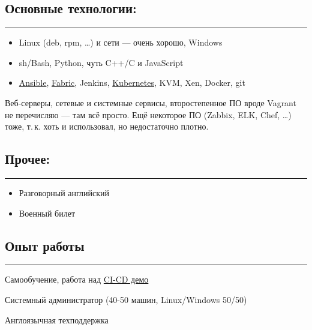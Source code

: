 \documentclass[10pt, a4paper]{article}
\newcommand{\Delimitline}{
  \vspace{-4ex}
  \textcolor[RGB]{120,120,120}{\rule{\linewidth}{1pt}}
  \vspace{-4ex}
}
\begin{document}
\subsection*{Основные технологии:}
\Delimitline
\begin{itemize}
  \item Linux (deb, rpm, \dots) и сети — очень хорошо, Windows
  \item sh/Bash, Python, чуть C++/C и JavaScript
  \item \href{https://github.com/bititanb/ansible-taskmngr}{Ansible}, \href{https://bitbucket.org/bititanb/ivd-fabric/src}{Fabric}, Jenkins, \href{https://github.com/bititanb/ansible-taskmngr/tree/master/roles/taskmngr-kubernetes/templates}{Kubernetes}, KVM, Xen, Docker, git\par
\end{itemize}

Веб-серверы, сетевые и системные сервисы, второстепенное ПО вроде Vagrant не перечисляю — там всё просто. Ещё некоторое ПО (Zabbix, ELK, Chef, \dots) тоже, т.\,к. хоть и использовал, но недостаточно плотно.

\subsection*{Прочее:}
\Delimitline
\begin{itemize}
  \item Разговорный английский
  \item Военный билет
\end{itemize}

\subsection*{Опыт работы}
\Delimitline
\begin{etaremune}
  \item Самообучение, работа над \href{https://github.com/bititanb/CI-CD-pipeline}{CI-CD демо}
  \item Системный администратор (40-50 машин, Linux/Windows 50/50)
  \item Англоязычная техподдержка
\end{etaremune}
\end{document}
